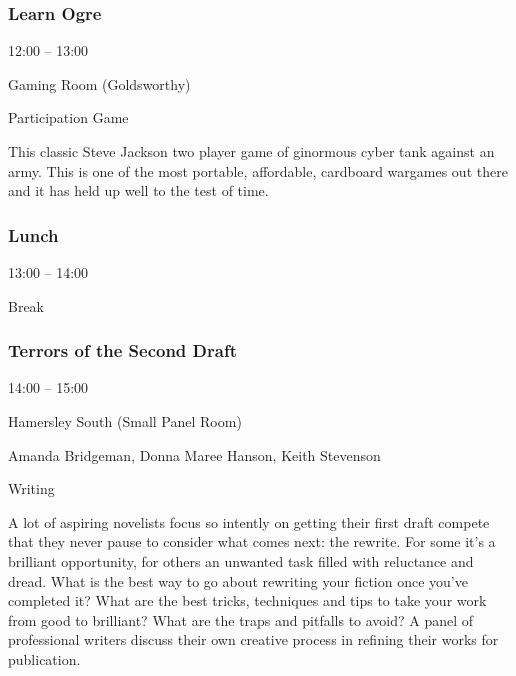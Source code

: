 \documentclass{scrreprt}
\begin{document}
\begin{multicols}{2}
\subsubsection*{Learn Ogre}\begin{description}
\setlength{\itemsep}{0pt}
\setlength{\parsep}{0pt}
\setlength{\parskip}{0pt}
\item[Time:]{12:00 -- 13:00}
\item[Venue:]{Gaming Room (Goldsworthy)}
\item[Tags:]{Participation Game}\end{description}
This classic Steve Jackson two player game of ginormous cyber tank against an army. This is one of the most portable, affordable, cardboard wargames out there and it has held up well to the test of time.
\subsubsection*{Lunch}\begin{description}
\setlength{\itemsep}{0pt}
\setlength{\parsep}{0pt}
\setlength{\parskip}{0pt}
\item[Time:]{13:00 -- 14:00}
\item[Tags:]{Break}\end{description}

\subsubsection*{Terrors of the Second Draft}\begin{description}
\setlength{\itemsep}{0pt}
\setlength{\parsep}{0pt}
\setlength{\parskip}{0pt}
\item[Time:]{14:00 -- 15:00}
\item[Venue:]{Hamersley South (Small Panel Room)}
\item[People:]{Amanda Bridgeman, Donna Maree Hanson, Keith Stevenson}
\item[Tags:]{Writing}\end{description}
A lot of aspiring novelists focus so intently on getting their first draft compete that they never pause to consider what comes next: the rewrite. For some it’s a brilliant opportunity, for others an unwanted task filled with reluctance and dread. What is the best way to go about rewriting your fiction once you’ve completed it? What are the best tricks, techniques and tips to take your work from good to brilliant? What are the traps and pitfalls to avoid? A panel of professional writers discuss their own creative process in refining their works for publication.

\end{multicols}
\end{document}
